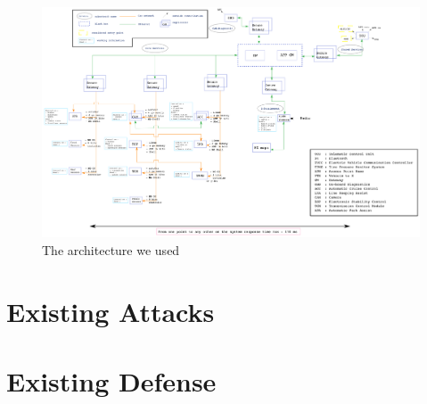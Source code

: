 \begin{figure}
    \centering
	\includegraphics[width=1\textwidth]{schema/architecture/Car_complete_architecture.pdf}
    \caption{The architecture we used}
    \label{used_archi}
\end{figure}




\section {Existing Attacks}

\section {Existing Defense}
